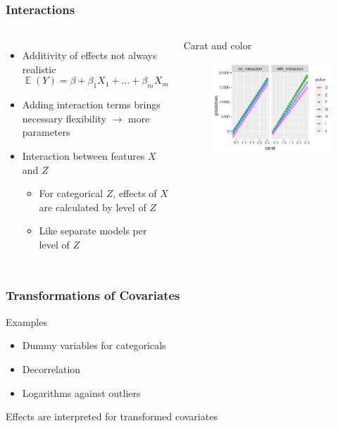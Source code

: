 \documentclass[
    utf8,
    aspectratio=169
]{beamer}  %
\DeclareMathOperator{\E}{\mathbb{E}}  %
\begin{document}
\begin{frame}
	\frametitle{Interactions}
	\begin{columns}
		\begin{itemize}
			\item Additivity of effects not always realistic
			$$
				\E(Y) = \beta + \beta_1 X_1 + \dots + \beta_m X_m
			$$
			\item Adding interaction terms brings necessary flexibility 
			$\rightarrow$ more parameters
			\item Interaction between features $X$ and $Z$
			\begin{itemize}
				\item For categorical $Z$, effects of $X$ are calculated by level of $Z$
				\item Like separate models per level of $Z$
			\end{itemize}
		\end{itemize}
		
		\begin{block}{\centering Carat and color}
			\begin{figure}
				\includegraphics[width=\textwidth]{pics/interaction.pdf}
			\end{figure}
		\end{block}
	\end{columns}
\end{frame}

\begin{frame}
	\frametitle{Transformations of Covariates}
	\begin{block}{Examples}
		\begin{itemize}
			\item Dummy variables for categoricals
			\item Decorrelation
			\item Logarithms against outliers
		\end{itemize}
	\end{block}
	
	\vfill
	
	Effects are interpreted for transformed covariates
\end{frame}
\end{document}
